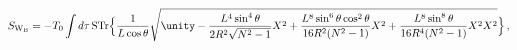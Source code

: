 \begin{equation}
S_{\rm W_B}=-T_0 \int d\tau\,  {\rm STr}\Bigl\{ \frac{1}{L\cos{\theta}}
\sqrt{\unity - \frac{L^4\sin^4{\theta}}{2 R^2\sqrt{N^2-1}} X^2
             + \frac{L^8\sin^6{\theta}\cos^2{\theta}}{16 R^2(N^2-1)}X^2
             + \frac{L^8\sin^8{\theta}}{16 R^4(N^2-1)}X^2X^2}    \Bigr\}\, ,
\end{equation}

